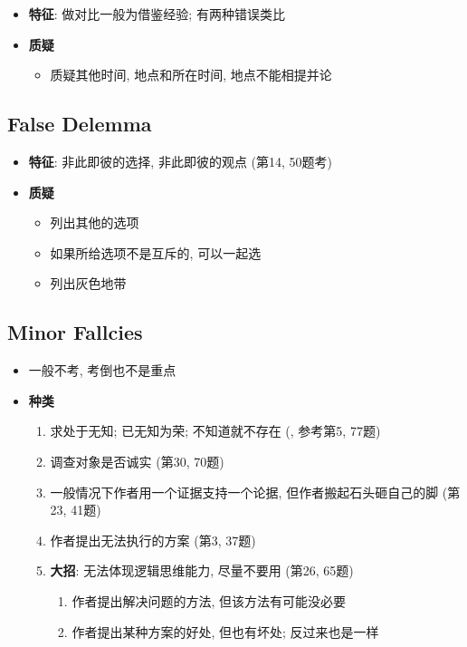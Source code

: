    \begin{itemize}
      \item \textbf{特征}: 做对比一般为借鉴经验; 有两种错误类比
      \item \textbf{质疑}
      \begin{itemize}
        \item 质疑其他时间, 地点和所在时间, 地点不能相提并论
      \end{itemize}
    \end{itemize}

  \subsection{False Delemma}

    \begin{itemize}
      \item \textbf{特征}: 非此即彼的选择, 非此即彼的观点 (第14, 50题考)
      \item \textbf{质疑}
      \begin{itemize}
        \item 列出其他的选项
        \item 如果所给选项不是互斥的, 可以一起选
        \item 列出灰色地带
      \end{itemize}
    \end{itemize}

  \subsection{Minor Fallcies}

    \begin{itemize}
      \item 一般不考, 考倒也不是重点
      \item \textbf{种类}
      \begin{enumerate}
        \item 求处于无知; 已无知为荣; 不知道就不存在
        (, 参考第5, 77题)
        \item 调查对象是否诚实 (第30, 70题)
        \item 一般情况下作者用一个证据支持一个论据, 但作者搬起石头砸自己的脚 (第23, 41题)
        \item 作者提出无法执行的方案 (第3, 37题)
        \item \textbf{大招}: 无法体现逻辑思维能力, 尽量不要用 (第26, 65题)
        \begin{enumerate}
          \item 作者提出解决问题的方法, 但该方法有可能没必要
          \item 作者提出某种方案的好处, 但也有坏处; 反过来也是一样
        \end{enumerate}
      \end{enumerate}
    \end{itemize}


